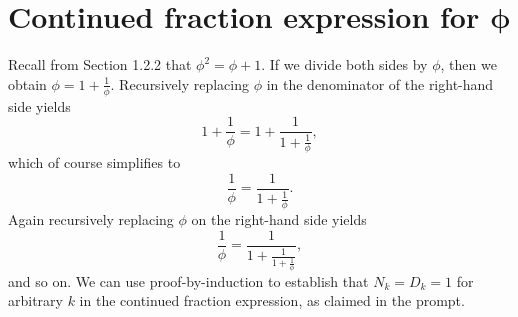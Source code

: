\documentclass{article}
\begin{document}
\section{Continued fraction expression for $\boldsymbol{\phi}$}

Recall from Section 1.2.2 that $\phi^2 = \phi + 1$.  If we divide both sides by
$\phi$, then we obtain $\phi = 1 + \frac{1}{\phi}$.  Recursively replacing
$\phi$ in the denominator of the right-hand side yields
\begin{equation*}
  1 + \frac{1}{\phi} = 1 + \frac{1}{
    1 + \frac{1}{\phi}},
\end{equation*}
which of course simplifies to
\begin{equation*}
  \frac{1}{\phi} = \frac{1}{
    1 + \frac{1}{\phi}}.
\end{equation*}
Again recursively replacing $\phi$ on the right-hand side yields
\begin{equation*}
  \frac{1}{\phi} = \frac{1}{
    1 + \frac{1}{
      1 + \frac{1}{\phi}}},
\end{equation*}
and so on.  We can use proof-by-induction to establish that $N_k = D_k = 1$ for
arbitrary $k$ in the continued fraction expression, as claimed in the prompt.





\end{document}
